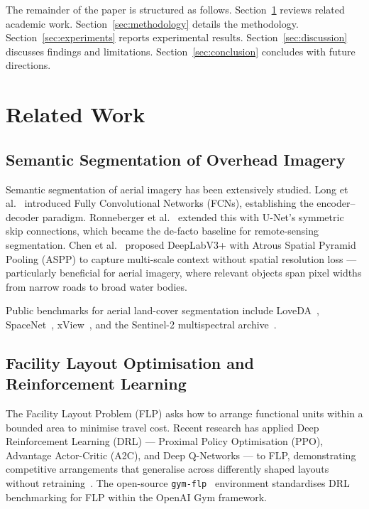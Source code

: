 \documentclass[twocolumn]{article}
\begin{document}
The remainder of the paper is structured as follows.
Section~\ref{sec:related} reviews related academic work.
Section~\ref{sec:methodology} details the methodology.
Section~\ref{sec:experiments} reports experimental results.
Section~\ref{sec:discussion} discusses findings and limitations.
Section~\ref{sec:conclusion} concludes with future directions.

\section{Related Work}
\label{sec:related}

\subsection{Semantic Segmentation of Overhead Imagery}

Semantic segmentation of aerial imagery has been extensively studied.
Long et al.~\cite{fcn} introduced Fully Convolutional Networks (FCNs), establishing the
encoder--decoder paradigm.
Ronneberger et al.~\cite{unet} extended this with U-Net's symmetric skip connections, which became
the de-facto baseline for remote-sensing segmentation.
Chen et al.~\cite{deeplabv3plus} proposed DeepLabV3+ with Atrous Spatial Pyramid Pooling (ASPP)
to capture multi-scale context without spatial resolution loss --- particularly beneficial for
aerial imagery, where relevant objects span pixel widths from narrow roads to broad water bodies.

Public benchmarks for aerial land-cover segmentation include LoveDA~\cite{loveda},
SpaceNet~\cite{spacenet}, xView~\cite{xview}, and the Sentinel-2 multispectral
archive~\cite{sentinel2}.

\subsection{Facility Layout Optimisation and Reinforcement Learning}

The Facility Layout Problem (FLP) asks how to arrange functional units within a bounded area to
minimise travel cost.
Recent research has applied Deep Reinforcement Learning (DRL) --- Proximal Policy Optimisation
(PPO), Advantage Actor-Critic (A2C), and Deep Q-Networks --- to FLP, demonstrating competitive
arrangements that generalise across differently shaped layouts without
retraining~\cite{flp_drl_2026,flp_generalise_2025}.
The open-source \texttt{gym-flp}~\cite{gymflp} environment standardises DRL benchmarking for FLP
within the OpenAI Gym framework.
\end{document}

